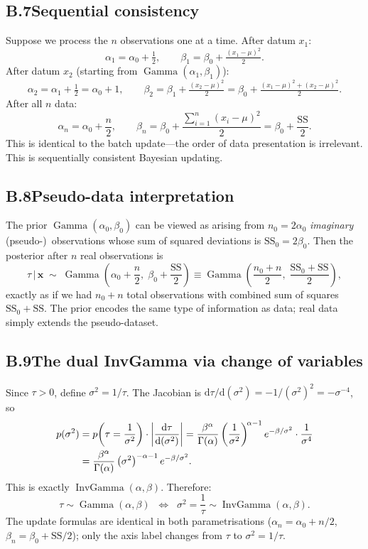 \documentclass[11pt, a4paper]{article}
\newcommand{\IG}{\operatorname{InvGamma}}
\newcommand{\Ga}{\operatorname{Gamma}}
\theoremstyle{definition}
\begin{document}
\subsection*{B.7\quad Sequential consistency}

Suppose we process the $n$ observations one at a time.  After datum $x_1$:
\[
  \alpha_1 = \alpha_0 + \tfrac{1}{2}, \qquad
  \beta_1  = \beta_0  + \tfrac{(x_1-\mu)^2}{2}.
\]
After datum $x_2$ (starting from $\Ga(\alpha_1,\beta_1)$):
\[
  \alpha_2 = \alpha_1 + \tfrac{1}{2} = \alpha_0 + 1, \qquad
  \beta_2  = \beta_1  + \tfrac{(x_2-\mu)^2}{2}
           = \beta_0  + \tfrac{(x_1-\mu)^2+(x_2-\mu)^2}{2}.
\]
After all $n$ data:
\[
  \alpha_n = \alpha_0 + \frac{n}{2}, \qquad
  \beta_n  = \beta_0 + \frac{\sum_{i=1}^n(x_i-\mu)^2}{2}
           = \beta_0 + \frac{\mathrm{SS}}{2}.
\]
This is identical to the batch update---the order of data presentation is irrelevant.
This is sequentially consistent Bayesian updating.

\subsection*{B.8\quad Pseudo-data interpretation}

The prior $\Ga(\alpha_0,\beta_0)$ can be viewed as arising from
$n_0=2\alpha_0$ \emph{imaginary} (pseudo-)~observations whose
sum of squared deviations is $\mathrm{SS}_0=2\beta_0$.  Then the
posterior after $n$ real observations is
\[
  \tau\,|\,\mathbf{x}
  \;\sim\;
  \Ga\!\left(\alpha_0+\frac{n}{2},\;
              \beta_0+\frac{\mathrm{SS}}{2}\right)
  \equiv
  \Ga\!\left(\frac{n_0+n}{2},\;
              \frac{\mathrm{SS}_0+\mathrm{SS}}{2}\right),
\]
exactly as if we had $n_0+n$ total observations with combined sum of
squares $\mathrm{SS}_0+\mathrm{SS}$.  The prior encodes the same type
of information as data; real data simply extends the pseudo-dataset.

\subsection*{B.9\quad The dual InvGamma via change of variables}

Since $\tau>0$, define $\sigma^2=1/\tau$.  The Jacobian is
$\mathrm{d}\tau/\mathrm{d}(\sigma^2) = -1/(\sigma^2)^2 = -\sigma^{-4}$, so
\begin{align}
  p(\sigma^2)
  &= p\!\left(\tau=\frac{1}{\sigma^2}\right)\cdot\left|\frac{\mathrm{d}\tau}{\mathrm{d}(\sigma^2)}\right|
   = \frac{\beta^{\alpha}}{\Gamma(\alpha)}
     \left(\frac{1}{\sigma^2}\right)^{\!\alpha-1}
     e^{-\beta/\sigma^2}\cdot\frac{1}{\sigma^4} \notag\\
  &= \frac{\beta^{\alpha}}{\Gamma(\alpha)}
     \left(\sigma^2\right)^{-\alpha-1}
     e^{-\beta/\sigma^2}.
  \label{eq:invgamma_derivation}
\end{align}
This is exactly $\IG(\alpha,\beta)$.  Therefore:
\[
  \tau\sim\Ga(\alpha,\beta)
  \;\;\Longleftrightarrow\;\;
  \sigma^2=\frac{1}{\tau}\sim\IG(\alpha,\beta).
\]
The update formulas are identical in both parametrisations
($\alpha_n=\alpha_0+n/2$, $\beta_n=\beta_0+\mathrm{SS}/2$);
only the axis label changes from $\tau$ to $\sigma^2=1/\tau$.
\end{document}
